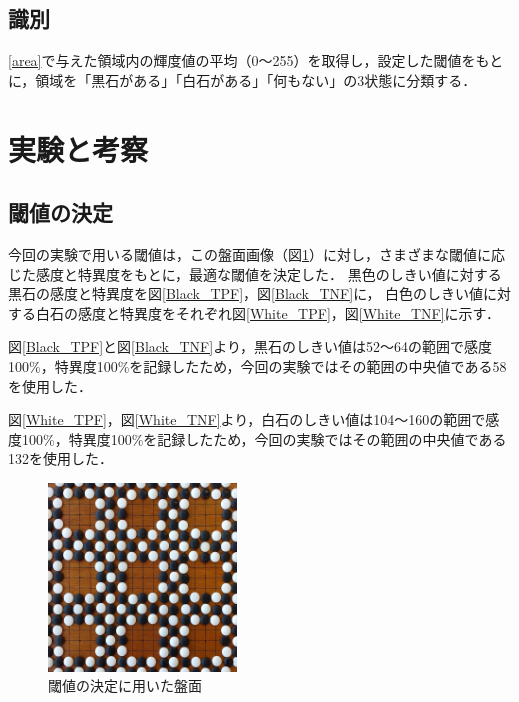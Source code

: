 \documentclass[openright]{nitocs}
\numberwithin{equation}{section}
\begin{document}
        \subsection{識別} \label{identify}  
            \ref{area}で与えた領域内の輝度値の平均（0～255）を取得し，設定した閾値をもとに，領域を「黒石がある」「白石がある」「何もない」の3状態に分類する．            

    \section{実験と考察} %
        \subsection{閾値の決定} \label{threshold}
            今回の実験で用いる閾値は，この盤面画像（図\ref{DSC0087}）に対し，さまざまな閾値に応じた感度と特異度をもとに，最適な閾値を決定した．
            黒色のしきい値に対する黒石の感度と特異度を図\ref{Black_TPF}，図\ref{Black_TNF}に，
            白色のしきい値に対する白石の感度と特異度をそれぞれ図\ref{White_TPF}，図\ref{White_TNF}に示す．

            図\ref{Black_TPF}と図\ref{Black_TNF}より，黒石のしきい値は52～64の範囲で感度100\%，特異度100\%を記録したため，今回の実験ではその範囲の中央値である58を使用した．

            図\ref{White_TPF}，図\ref{White_TNF}より，白石のしきい値は104～160の範囲で感度100\%，特異度100\%を記録したため，今回の実験ではその範囲の中央値である132を使用した．
            \begin{figure} %
                \begin{center}
                \includegraphics[width=50mm,height=50mm]{DSC_0087/boardImg.jpg} 
                \caption{閾値の決定に用いた盤面}
                \label{DSC0087}
                \end{center}
            \end{figure}
\end{document}
